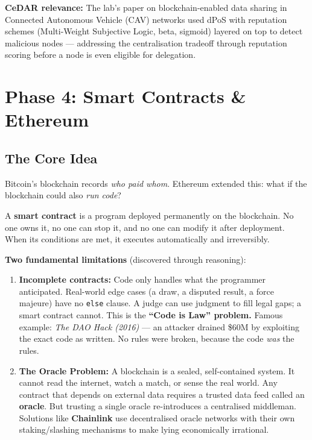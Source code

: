 \documentclass[12pt, a4paper]{article}
\begin{document}
\textbf{CeDAR relevance:} The lab's paper on blockchain-enabled data sharing in
Connected Autonomous Vehicle (CAV) networks used dPoS with reputation schemes
(Multi-Weight Subjective Logic, beta, sigmoid) layered on top to detect malicious
nodes --- addressing the centralisation tradeoff through reputation scoring before
a node is even eligible for delegation.

\section{Phase 4: Smart Contracts \& Ethereum}

\subsection{The Core Idea}

Bitcoin's blockchain records \emph{who paid whom}. Ethereum extended this: what if the
blockchain could also \emph{run code}?

A \textbf{smart contract} is a program deployed permanently on the blockchain. No one
owns it, no one can stop it, and no one can modify it after deployment. When its
conditions are met, it executes automatically and irreversibly.

\textbf{Two fundamental limitations} (discovered through reasoning):
\begin{enumerate}
    \item \textbf{Incomplete contracts:} Code only handles what the programmer
          anticipated. Real-world edge cases (a draw, a disputed result, a force
          majeure) have no \texttt{else} clause. A judge can use judgment to fill
          legal gaps; a smart contract cannot. This is the \textbf{``Code is Law''
          problem.} Famous example: \emph{The DAO Hack (2016)} --- an attacker
          drained \$60M by exploiting the exact code as written. No rules were
          broken, because the code \emph{was} the rules.

    \item \textbf{The Oracle Problem:} A blockchain is a sealed, self-contained
          system. It cannot read the internet, watch a match, or sense the real
          world. Any contract that depends on external data requires a trusted
          data feed called an \textbf{oracle}. But trusting a single oracle
          re-introduces a centralised middleman. Solutions like \textbf{Chainlink}
          use decentralised oracle networks with their own staking/slashing
          mechanisms to make lying economically irrational.
\end{enumerate}
\end{document}
